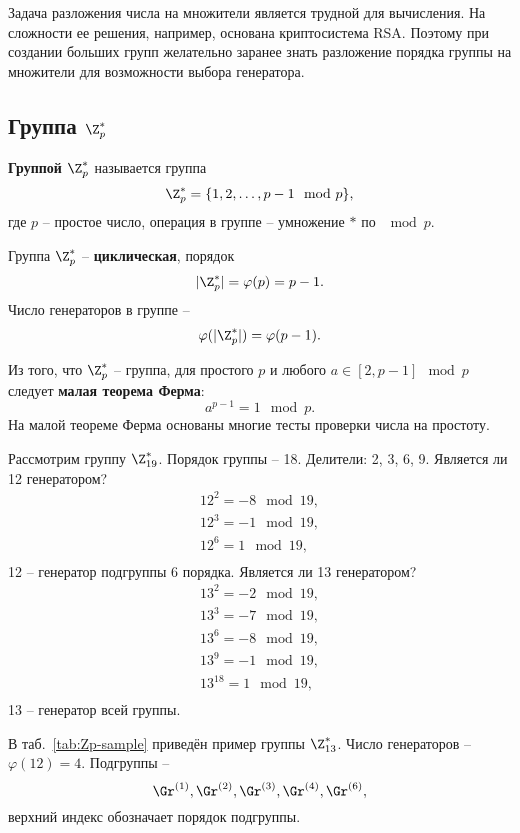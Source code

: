 Задача разложения числа на множители является трудной для вычисления. На сложности ее решения, например, основана криптосистема RSA. Поэтому при создании больших групп желательно заранее знать разложение порядка группы на множители для возможности выбора генератора.


\subsection{Группа $\Z_p^*$}\label{section-group-multiplicative}

\textbf{Группой $\Z_p^*$} называется группа
    \[ \Z_p^* = \{1, 2,  \dots,  p-1 \mod p\}, \]
где $p$ -- простое число, операция в группе -- умножение $\ast$ по $\mod p$.

Группа $\Z_p^*$ -- \textbf{циклическая}, порядок
    \[ |\Z_p^*| = \varphi(p) = p - 1. \]
Число генераторов в группе --
    \[ \varphi(|\Z_p^*|) = \varphi(p-1). \]

Из того, что $\Z_p^*$ -- группа, для простого $p$ и любого $a \in [2, p-1] \mod p$ следует \textbf{малая теорема Ферма}:
    \[ a^{p-1} = 1 \mod p. \]
На малой теореме Ферма основаны многие тесты проверки числа на простоту.

Рассмотрим группу $\Z_{19}^*$. Порядок группы -- 18. Делители: 2, 3, 6, 9. Является ли 12 генератором?
\[ \begin{array}{l}
    12^2 = -8 \mod 19, \\
    12^3 = -1 \mod 19, \\
    12^6 = 1 \mod 19, \\
\end{array} \]
12 -- генератор подгруппы 6 порядка. Является ли 13 генератором?
\[ \begin{array}{l}
    13^2 = -2 \mod 19, \\
    13^3 = -7 \mod 19, \\
    13^6 = -8 \mod 19, \\
    13^9 = -1 \mod 19, \\
    13^{18} = 1 \mod 19, \\
\end{array} \]
13 -- генератор всей группы.
\exampleend

В таб.~\ref{tab:Zp-sample} приведён пример группы $\Z_{13}^*$. Число генераторов -- $\varphi(12) = 4$. Подгруппы --
    \[ \Gr^{(1)}, \Gr^{(2)}, \Gr^{(3)}, \Gr^{(4)}, \Gr^{(6)}, \]
верхний индекс обозначает порядок подгруппы.

